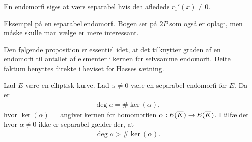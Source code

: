 En endomorfi siges at være separabel hvis den afledede $r_1'(x) \neq 0$.

\begin{example}
Eksempel på en separabel endomorfi. Bogen ser på $2P$ som også er oplagt, men måske skulle man vælge en mere interessant.
\end{example}


Den følgende proposition er essentiel idet, at det tilknytter graden af en endomorfi til antallet af elementer i kernen for selvsamme endomorfi. Dette faktum benyttes direkte i beviset for Hasses sætning.

\begin{proposition}
\label{deg_to_ker}
Lad $E$ være en elliptisk kurve. Lad $\alpha \neq 0$ være en separabel 
endomorfi for $E$. Da er 
\begin{align*}
	\deg \alpha = \# \ker (\alpha),
\end{align*}
hvor $\ker (\alpha) = $ angiver kernen for homomorfien 
$\alpha : E(\overline{K}) \to E(\overline{K})$. I tilfældet hvor $\alpha \neq 0$ ikke
er separabel gælder der, at 
\begin{align*}
	\deg \alpha > \# \ker (\alpha).
\end{align*}
\end{proposition}
